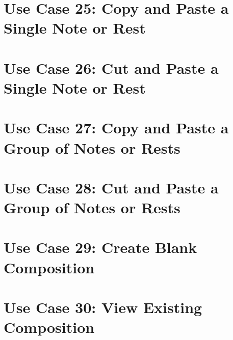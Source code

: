   \section{Use Case 25: Copy and Paste a Single Note or Rest}


  \section{Use Case 26: Cut and Paste a Single Note or Rest}


  \section{Use Case 27: Copy and Paste a Group of Notes or Rests}


  \section{Use Case 28: Cut and Paste a Group of Notes or Rests}


  \section{Use Case 29: Create Blank Composition}


  \section{Use Case 30: View Existing Composition}

